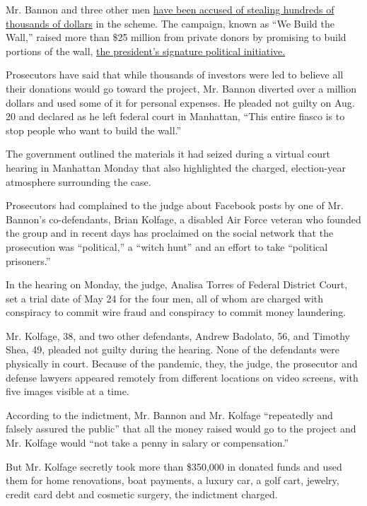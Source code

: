 Mr. Bannon and three other men
\href{https://www.nytimes3xbfgragh.onion/2020/08/20/nyregion/steve-bannon-arrested-indicted.html?searchResultPosition=1}{have
been accused of stealing hundreds of thousands of dollars} in the
scheme. The campaign, known as ``We Build the Wall,'' raised more than
\$25 million from private donors by promising to build portions of the
wall,
\href{https://www.nytimes3xbfgragh.onion/2020/08/20/us/politics/bannon-we-build-the-wall.html?searchResultPosition=3}{the
president's signature political initiative.}

Prosecutors have said that while thousands of investors were led to
believe all their donations would go toward the project, Mr. Bannon
diverted over a million dollars and used some of it for personal
expenses. He pleaded not guilty on Aug. 20 and declared as he left
federal court in Manhattan, ``This entire fiasco is to stop people who
want to build the wall.''

The government outlined the materials it had seized during a virtual
court hearing in Manhattan Monday that also highlighted the charged,
election-year atmosphere surrounding the case.

Prosecutors had complained to the judge about Facebook posts by one of
Mr. Bannon's co-defendants, Brian Kolfage, a disabled Air Force veteran
who founded the group and in recent days has proclaimed on the social
network that the prosecution was ``political,'' a ``witch hunt'' and an
effort to take ``political prisoners.''

In the hearing on Monday, the judge, Analisa Torres of Federal District
Court, set a trial date of May 24 for the four men, all of whom are
charged with conspiracy to commit wire fraud and conspiracy to commit
money laundering.

Mr. Kolfage, 38, and two other defendants, Andrew Badolato, 56, and
Timothy Shea, 49, pleaded not guilty during the hearing. None of the
defendants were physically in court. Because of the pandemic, they, the
judge, the prosecutor and defense lawyers appeared remotely from
different locations on video screens, with five images visible at a
time.

According to the indictment, Mr. Bannon and Mr. Kolfage ``repeatedly and
falsely assured the public'' that all the money raised would go to the
project and Mr. Kolfage would ``not take a penny in salary or
compensation.''

But Mr. Kolfage secretly took more than \$350,000 in donated funds and
used them for home renovations, boat payments, a luxury car, a golf
cart, jewelry, credit card debt and cosmetic surgery, the indictment
charged.

